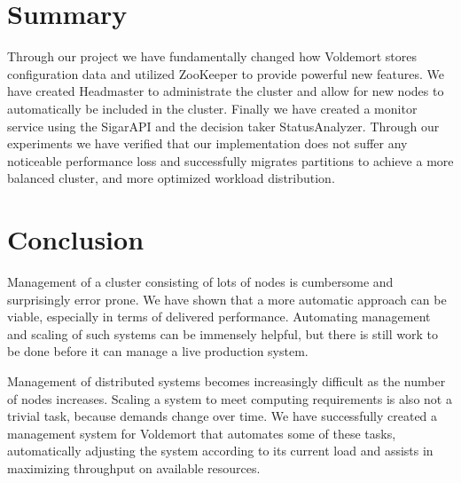 \section{Summary}
Through our project we have fundamentally changed how Voldemort stores configuration data and utilized ZooKeeper to provide powerful new features. We have created Headmaster to administrate the cluster and allow for new nodes to automatically be included in the cluster. Finally we have created a monitor service using the SigarAPI and the decision taker StatusAnalyzer. Through our experiments we have verified that our implementation does not suffer any noticeable performance loss and successfully migrates partitions to achieve a more balanced cluster, and more optimized workload distribution. 

\section{Conclusion}
Management of a cluster consisting of lots of nodes is cumbersome and surprisingly error prone. We have shown that a more automatic approach can be viable, especially in terms of delivered performance. Automating management and scaling of such systems can be immensely helpful, but there is still work to be done before it can manage a live production system.

Management of distributed systems becomes increasingly difficult as the number of nodes increases. Scaling a system to meet computing requirements is also not a trivial task, because demands change over time. We have successfully created a management system for Voldemort that automates some of these tasks, automatically adjusting the system according to its current load and assists in maximizing throughput on available resources.
